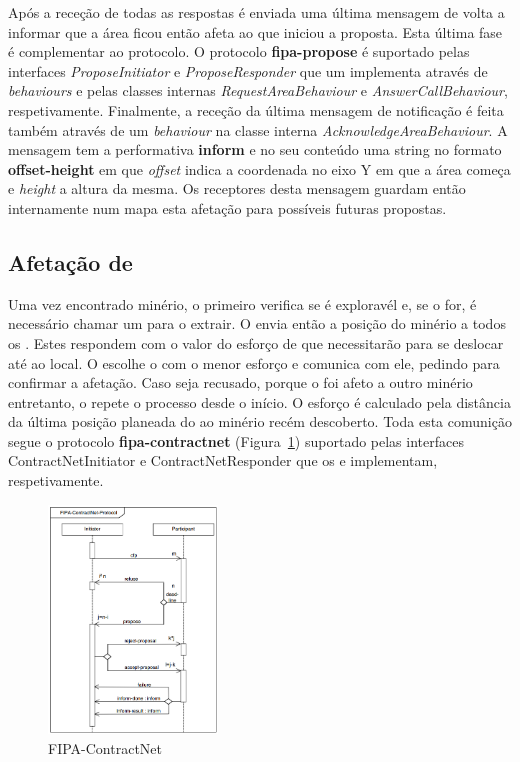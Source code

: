 \documentclass[12pt]{report}
\begin{document}
Após a receção de todas as respostas é enviada uma última mensagem de volta a informar que a área ficou então afeta ao \spotter que iniciou a proposta. Esta última fase é complementar ao protocolo.
O protocolo \textbf{fipa-propose} é suportado pelas interfaces \emph{ProposeInitiator} e \emph{ProposeResponder} que um \spotter implementa através de \emph{behaviours} e pelas classes internas 
\emph{RequestAreaBehaviour} e \emph{AnswerCallBehaviour}, respetivamente.
Finalmente, a receção da última mensagem de notificação é feita também através de um \emph{behaviour} na classe interna \emph{AcknowledgeAreaBehaviour}. A mensagem tem a performativa \textbf{inform} e
no seu conteúdo uma string no formato \textbf{offset-height} em que \emph{offset} indica a coordenada no eixo Y em que a área começa e \emph{height} a altura da mesma. Os receptores desta mensagem
guardam então internamente num mapa esta afetação para possíveis futuras propostas.

\FloatBarrier
\subsection{Afetação de \producers}
Uma vez encontrado minério, o \spotter primeiro verifica se é exploravél e, se o for, é necessário chamar um \producer para o extrair. O \spotter envia então a posição do minério a todos os \producers. 
Estes respondem com o valor do esforço de que necessitarão para se deslocar até ao local. O \spotter escolhe o \producer com o menor esforço e comunica com ele, pedindo para confirmar a afetação. 
Caso seja recusado, porque o \producer foi afeto a outro minério entretanto, o \spotter repete o processo desde o início. O esforço é calculado pela distância da última posição planeada do \producer
ao minério recém descoberto.
Toda esta comunição segue o protocolo \textbf{fipa-contractnet} (Figura~\ref{fipa-contract-net}) suportado pelas interfaces ContractNetInitiator e ContractNetResponder que os \spotters e \producers implementam, respetivamente.

\begin{figure}[h]
	\centering
    \includegraphics[width=0.4\textwidth]{fipa-contract-net}
	\caption{FIPA-ContractNet}
	\label{fipa-contract-net}
\end{figure}
\end{document}
